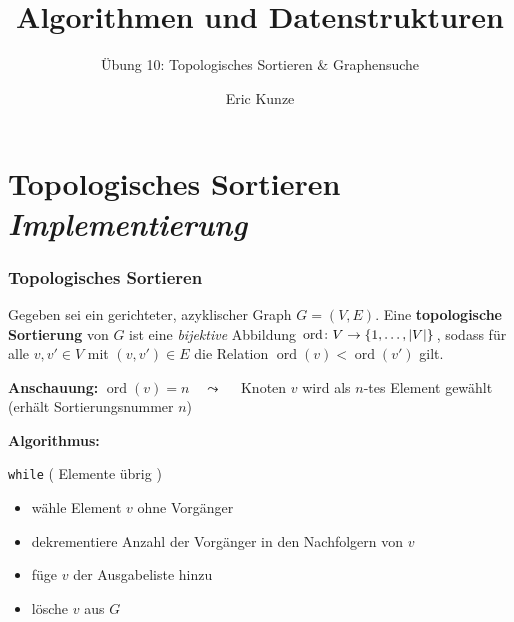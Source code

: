 \documentclass{beamer}
\begin{document}
	\title{Algorithmen und Datenstrukturen}
	\subtitle{Übung 10: Topologisches Sortieren \& Graphensuche}
	\author{Eric Kunze}
	\date{}

	\maketitle



\section{Topologisches Sortieren \\ \itshape Implementierung}

\begin{frame} \frametitle{Topologisches Sortieren}
	\small
	Gegeben sei ein gerichteter, azyklischer Graph $G = (V,E)$. Eine \textbf{topologische Sortierung} von $G$ ist eine \textit{bijektive} Abbildung $\operatorname{ord} \colon V \to \left\{ 1, \dots, \left| V \right| \right\}$, sodass für alle $v, v' \in V$ mit $(v,v') \in E$ die Relation
	$\operatorname{ord}(v) < \operatorname{ord}(v')$ gilt.
	
	\textbf{Anschauung:} $\operatorname{ord}(v) = n \quad \leadsto \quad$ Knoten $v$ wird als $n$-tes Element gewählt (erhält Sortierungsnummer $n$) 
	
	\pause
	
	\textbf{Algorithmus:}
	
	\texttt{while} ( Elemente übrig ) 
	\begin{itemize}
		\item wähle Element $v$ ohne Vorgänger
		\item dekrementiere Anzahl der Vorgänger in den Nachfolgern von $v$
		\item füge $v$ der Ausgabeliste hinzu
		\item lösche $v$ aus $G$
	\end{itemize}
\end{frame}
\end{document}
